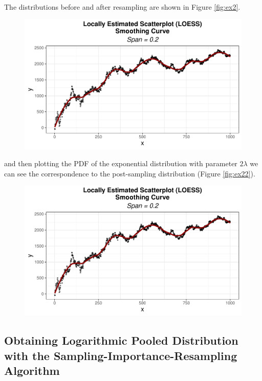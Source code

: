 \documentclass[12pt,twoside]{smiththesis}
\begin{document}
The distributions before and after resampling are shown in Figure \ref{fig:ex2}.
\begin{figure}

{\centering \includegraphics[width=1\linewidth]{thesis_files/figure-latex/unnamed-chunk-17-1} 

}

\caption{\label{fig:ex2}}\label{fig:unnamed-chunk-17}
\end{figure}
and then plotting the PDF of the exponential distribution with parameter \(2\lambda\) we can see the correspondence to the post-sampling distribution (Figure \ref{fig:ex22}).
\begin{figure}

{\centering \includegraphics[width=1\linewidth]{thesis_files/figure-latex/unnamed-chunk-18-1} 

}

\caption{\label{fig:ex22}}\label{fig:unnamed-chunk-18}
\end{figure}
\newpage

\hypertarget{logpooled}{%
\subsection{Obtaining Logarithmic Pooled Distribution with the Sampling-Importance-Resampling Algorithm}\label{logpooled}}
\end{document}
